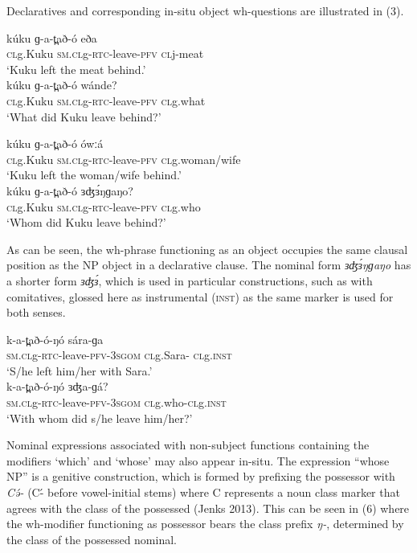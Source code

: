 Declaratives and corresponding in-situ object wh-questions are illustrated in (3).

\ea
\ea \gll	kúku	ɡ-a-t̪að-ó	eða\\
	\textsc{cl}g.Kuku	\textsc{sm.cl}g-\textsc{rtc}-leave-\textsc{pfv}	\textsc{cl}j-meat   \\  			     
\trans	‘Kuku left the meat behind.’\\
\ex \gll	kúku	ɡ-a-t̪að-ó	wánde?\\
	\textsc{cl}g.Kuku	\textsc{sm.cl}g-\textsc{rtc}-leave-\textsc{pfv}	\textsc{cl}g.what\\
\trans	‘What did Kuku leave behind?’	\\
\z
\z

\ea
\ea \gll	kúku	ɡ-a-t̪að-ó	ówːá     \\
	\textsc{cl}g.Kuku	\textsc{sm.cl}g-\textsc{rtc}-leave-\textsc{pfv}	\textsc{cl}g.woman/wife\\
\trans	‘Kuku left the woman/wife behind.’\\
\ex \gll	kúku		ɡ-a-t̪að-ó             	ɜʤɜ́ŋɡaŋo?	\\
		\textsc{cl}g.Kuku	\textsc{sm.cl}g-\textsc{rtc}-leave-\textsc{pfv}	\textsc{cl}g.who\\
\trans		‘Whom did Kuku leave behind?’\\
\z
\z

As can be seen, the wh-phrase functioning as an object occupies the same clausal position as the NP object in a declarative clause.
The nominal form \textit{ɜʤɜ́ŋɡaŋo} has a shorter form \textit{ɜʤɜ́}, which is used in particular constructions, such as with comitatives, glossed here as instrumental (\textsc{inst}) as the same marker is used for both senses. 

\ea
\ea \gll k-a-t̪að-ó-ŋó		sára-ɡa\\
\textsc{sm.cl}g-\textsc{rtc}-leave-\textsc{pfv}-3\textsc{sgom}	\textsc{cl}g.Sara- \textsc{cl}g.\textsc{inst}\\
\trans ‘S/he left him/her with Sara.’\\
\ex	\gll k-a-t̪að-ó-ŋó		ɜʤa-ɡá?\\
\textsc{sm.cl}g-\textsc{rtc}-leave-\textsc{pfv}-3\textsc{sgom}	\textsc{cl}g.who-\textsc{cl}g.\textsc{inst}\\
\trans ‘With whom did s/he leave him/her?’\\
\z
\z

Nominal expressions associated with non-subject functions containing the modifiers ‘which’ and ‘whose’ may also appear in-situ. The expression “whose NP” is a genitive construction, which is formed by prefixing the possessor with \textit{Cə́-} (C-́ before vowel-initial stems) where C represents a noun class marker that agrees with the class of the possessed (Jenks 2013).  This can be seen in (6) where the wh-modifier functioning as possessor bears the class prefix \textit{ŋ-}, determined by the class of the possessed nominal.  


